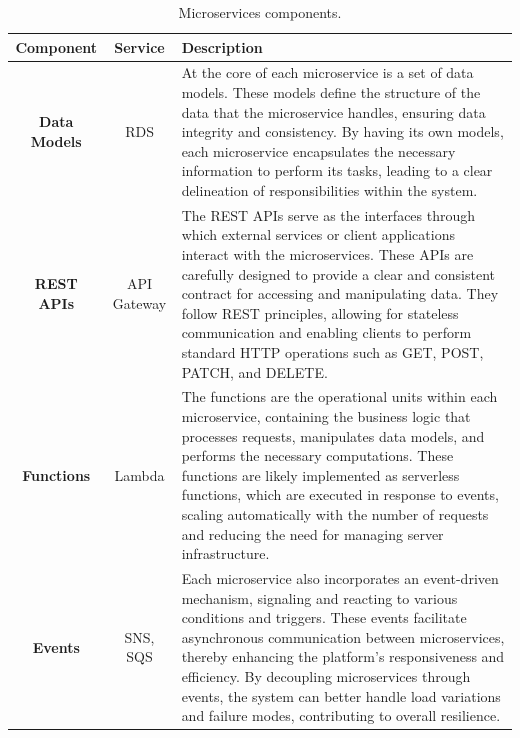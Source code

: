 \begin{table}
    \centering
    \begin{tabular}{|c|c|m{8.5cm}|}
        \hline
        \textbf{Component}   & \textbf{Service} & \textbf{Description}                                                                                                                                                                                                                                                                                                                                                                                                \\ \hline
        \textbf{Data Models} & RDS              & At the core of each microservice is a set of data models. These models define the structure of the data that the microservice handles, ensuring data integrity and consistency. By having its own models, each microservice encapsulates the necessary information to perform its tasks, leading to a clear delineation of responsibilities within the system.                                                      \\ \hline
        \textbf{REST APIs}   & API Gateway      & The REST APIs serve as the interfaces through which external services or client applications interact with the microservices. These APIs are carefully designed to provide a clear and consistent contract for accessing and manipulating data. They follow REST principles, allowing for stateless communication and enabling clients to perform standard HTTP operations such as GET, POST, PATCH, and DELETE.    \\ \hline
        \textbf{Functions}   & Lambda           & The functions are the operational units within each microservice, containing the business logic that processes requests, manipulates data models, and performs the necessary computations. These functions are likely implemented as serverless functions, which are executed in response to events, scaling automatically with the number of requests and reducing the need for managing server infrastructure.    \\ \hline
        \textbf{Events}      & SNS, SQS         & Each microservice also incorporates an event-driven mechanism, signaling and reacting to various conditions and triggers. These events facilitate asynchronous communication between microservices, thereby enhancing the platform's responsiveness and efficiency. By decoupling microservices through events, the system can better handle load variations and failure modes, contributing to overall resilience. \\ \hline
    \end{tabular}
    \caption{Microservices components.}
    \label{tab:microservices_components}
\end{table}

